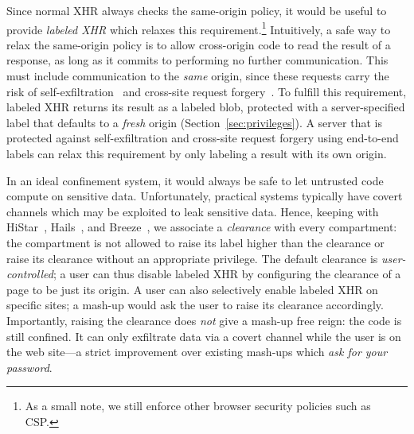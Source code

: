 Since normal XHR always checks the same-origin policy, it would be
useful to provide \emph{labeled XHR} which relaxes this requirement.\footnote{As a small note, we still enforce other browser security policies such as CSP.}
%
Intuitively, a safe way to relax the same-origin policy is to allow
cross-origin code to read the result of a response, as long as it
commits to performing no further communication.
%
This must include communication to the \emph{same} origin, since these requests
carry the risk of self-exfiltration~\cite{selfex} and cross-site request
forgery~.
%
To fulfill this requirement, labeled XHR returns its result as a labeled
blob, protected with a server-specified label that defaults to a \emph{fresh}
origin (Section~\ref{sec:privileges}).
%
A server that is protected against self-exfiltration and cross-site
request forgery using end-to-end labels can relax this requirement by
only labeling a result with its own origin.

In an ideal confinement system, it would always be safe to let untrusted
code compute on sensitive data.
%
Unfortunately, practical systems typically have covert channels which
may be exploited to leak sensitive data.
%
Hence, keeping with HiStar~\cite{Zeldovich:2006},
Hails~\cite{giffin:2012:hails}, and Breeze~\cite{Breeze13}, we associate
a \emph{clearance} with every compartment: the compartment is not
allowed to raise its label higher than the clearance or raise its
clearance without an appropriate privilege.
%
The default clearance is \emph{user-controlled}; a user can thus disable
labeled XHR by configuring the clearance of a page to be just
its origin.
%
A user can also selectively enable labeled XHR on specific sites; a
mash-up would ask the user to raise its clearance accordingly.
%
Importantly, raising the clearance does \emph{not} give a mash-up free reign:
the code is still confined.
%
It can only exfiltrate data via a covert channel while the user
is on the web site---a strict improvement over existing mash-ups which
\emph{ask for your password}.


